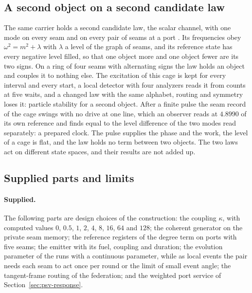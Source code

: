 \subsection{A second object on a second candidate law}
\label{sec:psv-cage}

The same carrier holds a second candidate law, the scalar channel, with one mode on every
seam and on every pair of seams at a port \cite{ophmodel}. Its frequencies obey
$\omega^2=m^2+\lambda$ with $\lambda$ a level of the graph of seams, and its reference state
has every negative level filled, so that one object more and one object fewer are its two
signs. On a ring of four seams with alternating signs the law holds an object and couples
it to nothing else. The excitation of this cage is kept for every interval and every
start, a local detector with four analyzers reads it from counts at five waits, and a
changed law with the same alphabet, routing and symmetry loses it: particle stability for
a second object. After a finite pulse the seam record of the cage swings with no drive at
one line, which an observer reads at $4.8990$ of its own reference and finds equal to the
level difference of the two modes read separately: a prepared clock. The pulse supplies
the phase and the work, the level of a cage is flat, and the law holds no term between two
objects. The two laws act on different state spaces, and their results are not added up.

\subsection{Supplied parts and limits}
\label{sec:psv-scope}

\paragraph{Supplied.}
The following parts are design choices of the construction: the coupling $\kappa$, with
computed values $0$, $0.5$, $1$, $2$, $4$, $8$, $16$, $64$ and $128$; the coherent generator
on the private seam memory; the reference registers of the degree term on ports with five
seams; the emitter with its fuel, coupling and duration; the evolution parameter of the
runs with a continuous parameter, while as local events the pair needs each seam to act
once per round or the limit of small event angle; the tangent-frame routing of the
federation; and the weighted port service of Section~\ref{sec:psv-response}.

